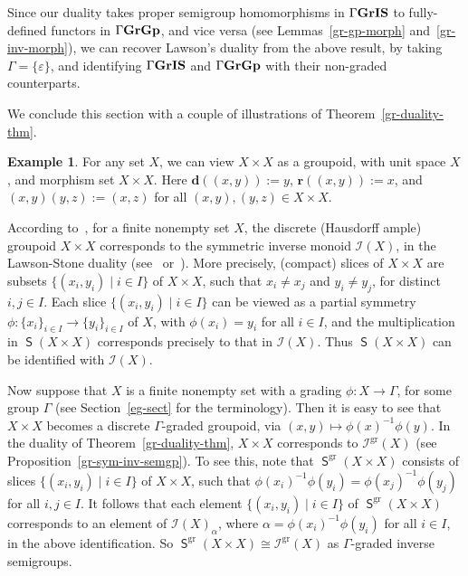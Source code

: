 \documentclass[a4paper,reqno,12pt]{amsart}
\numberwithin{equation}{section}
\theoremstyle{plain}
\theoremstyle{definition}
\newtheorem{example}[thm]{Example}
\newcommand{\ran}{\bm{r}}
\newcommand{\domr}{\bm{d}}
\newcommand{\gr}{\operatorname{gr}}
\newcommand{\GIS}{\operatorname{\Gamma\bf{GrIS}}}
\newcommand{\GG}{\operatorname{\Gamma\bf{GrGp}}}
\newcommand{\SG}{\operatorname{\mathsf{S}}}
\begin{document}
Since our duality takes proper semigroup homomorphisms in $\GIS$ to fully-defined functors in $\GG$, and vice versa (see Lemmas~\ref{gr-gp-morph} and~\ref{gr-inv-morph}), we can recover Lawson's duality \cite[Theorem 1.4]{Lawson3} from the above result, by taking $\Gamma = \{\varepsilon\}$, and identifying $\GIS$ and $\GG$ with their non-graded counterparts.

We conclude this section with a couple of illustrations of Theorem~\ref{gr-duality-thm}.

\begin{example} \label{set-prod-groupoid}
For any set $X$, we can view $X \times X$ as a groupoid, with unit space $X$, and morphism set $X\times X$. Here $\domr((x,y)) := y$, $\ran((x,y)) := x$, and $(x,y)(y,z) := (x,z)$ for all $(x,y),(y,z) \in X \times X$.

According to~\cite[Example 2.25]{Lawson2}, for a finite nonempty set $X$, the discrete (Hausdorff ample) groupoid $X \times X$ corresponds to the symmetric inverse monoid $\mathcal{I}(X)$, in the Lawson-Stone duality (see~\cite{Lawson2} or~\cite[Theorem 1.4]{Lawson3}). More precisely, (compact) slices of $X\times X$ are subsets $\{(x_i,y_i) \mid i \in I\}$ of $X \times X$, such that $x_i\neq x_j$ and $y_i \neq y_j$, for distinct $i,j \in I$. Each slice $\{(x_i,y_i) \mid i \in I\}$ can be viewed as a partial symmetry $\phi: \{x_i\}_{i \in I} \to \{y_i\}_{i\in I}$ of $X$, with $\phi(x_i) = y_i$ for all $i \in I$, and the multiplication in $\SG(X\times X)$ corresponds precisely to that in $\mathcal{I}(X)$. Thus $\SG(X\times X)$ can be identified with $\mathcal{I}(X)$.

Now suppose that $X$ is a finite nonempty set with a grading $\phi: X \to \Gamma$, for some group $\Gamma$ (see Section~\ref{eg-sect} for the terminology). Then it is easy to see that $X\times X$ becomes a discrete $\Gamma$-graded groupoid, via $(x,y)\mapsto \phi(x)^{-1}\phi(y)$. In the duality of Theorem~\ref{gr-duality-thm}, $X\times X$ corresponds to $\mathcal{I}^{\gr}(X)$ (see Proposition~\ref {gr-sym-inv-semgp}). To see this, note that $\SG^{\gr}(X\times X)$ consists of slices $\{(x_i,y_i) \mid i \in I\}$ of $X \times X$, such that $\phi(x_i)^{-1}\phi(y_i) = \phi(x_j)^{-1}\phi(y_j)$ for all $i,j \in I$. It follows that each element $\{(x_i,y_i) \mid i \in I\}$ of $\SG^{\gr}(X\times X)$ corresponds to an element of $\mathcal{I}(X)_{\alpha}$, where $\alpha = \phi(x_i)^{-1}\phi(y_i)$ for all $i \in I$, in the above identification. So $\SG^{\gr}(X\times X) \cong \mathcal{I}^{\gr}(X)$ as $\Gamma$-graded inverse semigroups.
\end{example}
\end{document}
